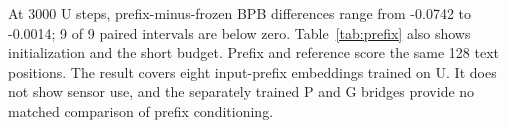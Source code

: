 At 3000 U steps, prefix-minus-frozen BPB differences range from -0.0742 to -0.0014; 9 of 9 paired intervals are below zero. Table~\ref{tab:prefix} also shows initialization and the short budget. Prefix and reference score the same 128 text positions. The result covers eight input-prefix embeddings trained on U. It does not show sensor use, and the separately trained P and G bridges provide no matched comparison of prefix conditioning.
